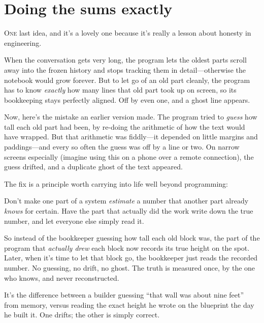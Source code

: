 \documentclass[11pt,twoside]{book}
\begin{document}
\chapter{Doing the sums exactly}
\lettrine{O}{ne} last idea, and it's a lovely one because it's really a lesson
about honesty in engineering.

When the conversation gets very long, the program lets the oldest parts scroll
away into the frozen history and stops tracking them in detail---otherwise the
notebook would grow forever. But to let go of an old part cleanly, the program
has to know \emph{exactly} how many lines that old part took up on screen, so
its bookkeeping stays perfectly aligned. Off by even one, and a ghost line
appears.

Now, here's the mistake an earlier version made. The program tried to
\emph{guess} how tall each old part had been, by re-doing the arithmetic of how
the text would have wrapped. But that arithmetic was fiddly---it depended on
little margins and paddings---and every so often the guess was off by a line or
two. On narrow screens especially (imagine using this on a phone over a remote
connection), the guess drifted, and a duplicate ghost of the text appeared.

The fix is a principle worth carrying into life well beyond programming:

\begin{insight}
Don't make one part of a system \emph{estimate} a number that another part
already \emph{knows} for certain. Have the part that actually did the work
write down the true number, and let everyone else simply read it.
\end{insight}

So instead of the bookkeeper guessing how tall each old block was, the part of
the program that \emph{actually drew} each block now records its true height on
the spot. Later, when it's time to let that block go, the bookkeeper just reads
the recorded number. No guessing, no drift, no ghost. The truth is measured
once, by the one who knows, and never reconstructed.

\begin{pic}
It's the difference between a builder guessing ``that wall was about nine feet''
from memory, versus reading the exact height he wrote on the blueprint the day
he built it. One drifts; the other is simply correct.
\end{pic}
\end{document}

